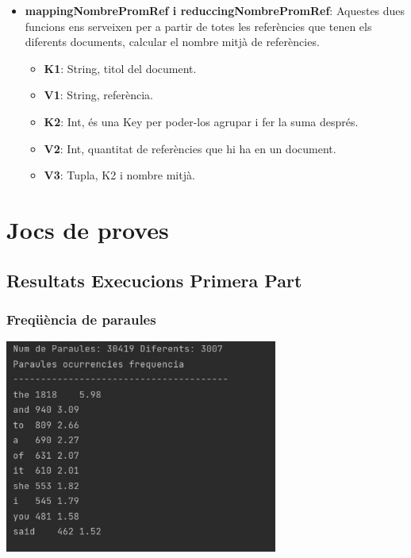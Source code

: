 \documentclass[11pt,a4paper]{article}
\begin{document}
\begin{itemize}
\begin{itemize}
			\item \textbf{mappingNombrePromRef i reduccingNombrePromRef}:
			Aquestes dues funcions ens serveixen per a partir de totes les referències que tenen els diferents documents, calcular el nombre mitjà de referències.
			\begin{itemize}
				\item \textbf{K1}: String, titol del document.
				\item \textbf{V1}: String, referència.
				\item \textbf{K2}:  Int, és una Key per poder-los agrupar i fer la suma després.
				\item \textbf{V2}:  Int, quantitat de referències que hi ha en un document.
				\item \textbf{V3}:  Tupla, K2 i nombre mitjà.
			\end{itemize}
		\end{itemize}
	\end{itemize}

\section{Jocs de proves}

	\subsection{Resultats Execucions Primera Part}
	
		\subsubsection{Freqüència de paraules}
		
			\begin{center}
				\includegraphics[height=7cm]{captures/primeraPart/freq/resultatFreq.jpg}
			\end{center}
		
\end{document}
